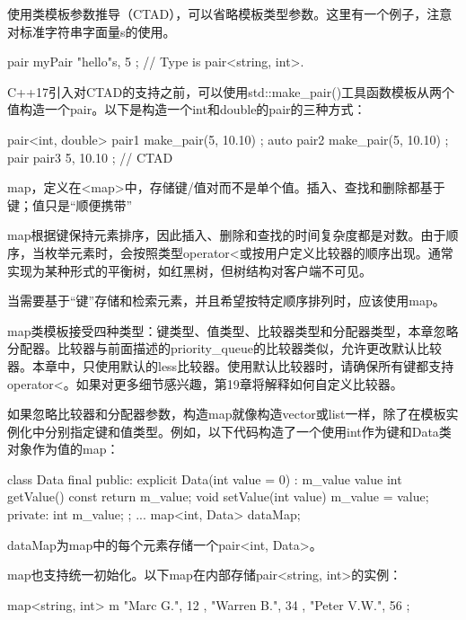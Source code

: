 使用类模板参数推导（CTAD），可以省略模板类型参数。这里有一个例子，注意对标准字符串字面量s的使用。

\begin{cpp}
pair myPair { "hello"s, 5 }; // Type is pair<string, int>.
\end{cpp}

C++17引入对CTAD的支持之前，可以使用std::make\_pair()工具函数模板从两个值构造一个pair。以下是构造一个int和double的pair的三种方式：

\begin{cpp}
pair<int, double> pair1 { make_pair(5, 10.10) };
auto pair2 { make_pair(5, 10.10) };
pair pair3 { 5, 10.10 }; // CTAD
\end{cpp}


map，定义在<map>中，存储键/值对而不是单个值。插入、查找和删除都基于键；值只是“顺便携带”

map根据键保持元素排序，因此插入、删除和查找的时间复杂度都是对数。由于顺序，当枚举元素时，会按照类型operator<或按用户定义比较器的顺序出现。通常实现为某种形式的平衡树，如红黑树，但树结构对客户端不可见。

当需要基于“键”存储和检索元素，并且希望按特定顺序排列时，应该使用map。


map类模板接受四种类型：键类型、值类型、比较器类型和分配器类型，本章忽略分配器。比较器与前面描述的priority\_queue的比较器类似，允许更改默认比较器。本章中，只使用默认的less比较器。使用默认比较器时，请确保所有键都支持operator<。如果对更多细节感兴趣，第19章将解释如何自定义比较器。

如果忽略比较器和分配器参数，构造map就像构造vector或list一样，除了在模板实例化中分别指定键和值类型。例如，以下代码构造了一个使用int作为键和Data类对象作为值的map：

\begin{cpp}
class Data final
{
    public:
        explicit Data(int value = 0) : m_value { value } { }
        int getValue() const { return m_value; }
        void setValue(int value) { m_value = value; }
    private:
        int m_value;
};
...
map<int, Data> dataMap;
\end{cpp}

dataMap为map中的每个元素存储一个pair<int, Data>。

map也支持统一初始化。以下map在内部存储pair<string, int>的实例：

\begin{cpp}
map<string, int> m {
    { "Marc G.", 12 }, { "Warren B.", 34 }, { "Peter V.W.", 56 }
};
\end{cpp}

